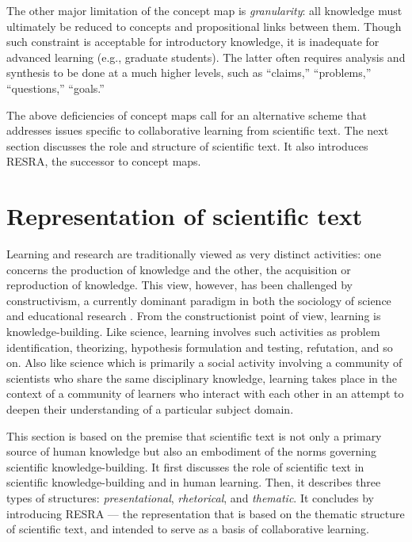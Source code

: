The other major limitation of the concept map is {\it granularity\/}: all
knowledge must ultimately be reduced to concepts and propositional links
between them.  Though such constraint is acceptable for introductory
knowledge, it is inadequate for advanced learning (e.g., graduate
students). The latter often requires analysis and synthesis to be done at a
much higher levels, such as ``claims,'' ``problems,'' ``questions,''
``goals.''

The above deficiencies of concept maps call for an alternative scheme that
addresses issues specific to collaborative learning from scientific text.
The next section discusses the role and structure of scientific text. It
also introduces RESRA, the successor to concept maps.


\section{Representation of scientific text}
\label{sec:research artifacts}

Learning and research are traditionally viewed as very distinct activities:
one concerns the production of knowledge and the other, the acquisition or
reproduction of knowledge. This view, however, has been challenged by
constructivism, a currently dominant paradigm in both the sociology of
science and educational research \cite{Berger66,Knorr-Cetina81}. From the
constructionist point of view, learning is knowledge-building. Like
science, learning involves such activities as problem identification,
theorizing, hypothesis formulation and testing, refutation, and so on. Also
like science which is primarily a social activity involving a community of
scientists who share the same disciplinary knowledge, learning takes place
in the context of a community of learners who interact with each other in
an attempt to deepen their understanding of a particular subject
domain.

This section is based on the premise that scientific text is not only a
primary source of human knowledge but also an embodiment of the norms
governing scientific knowledge-building. It first discusses the role of
scientific text in scientific knowledge-building and in human
learning. Then, it describes three types of structures: {\it
presentational\/}, {\it rhetorical\/}, and {\it thematic\/}. It concludes
by introducing RESRA --- the representation that is based on the thematic
structure of scientific text, and intended to serve as a basis of
collaborative learning.



